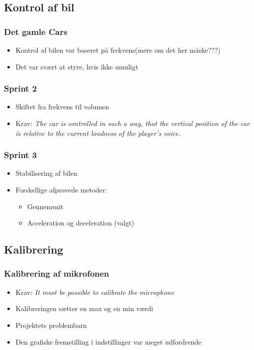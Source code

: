 \subsection{Kontrol af bil}
\begin{frame}
\frametitle{Det gamle Cars}
\begin{itemize}
\item Kontrol af bilen var baseret på frekvens(mere om det her måske???)
\item Det var svært at styre, hvis ikke umuligt
\end{itemize}
\end{frame}

\begin{frame}
\frametitle{Sprint 2}
\begin{itemize}
\item Skiftet fra frekvens til volumen
\item Krav: \textit{The car is controlled in such a way,
that the vertical position of the car is relative
to the current loudness of the player's voice.}
\end{itemize}
\begin{figure}
\centering

\end{figure}
\end{frame}

\begin{frame}
\frametitle{Sprint 3}
\begin{itemize}
\item Stabilisering af bilen
\item Forskellige afprøvede metoder:
\begin{itemize}
\item Gennemsnit
\item Acceleration og deceleration (valgt)
\end{itemize}
\end{itemize}
\end{frame}


\subsection{Kalibrering}
\begin{frame}
\frametitle{Kalibrering af mikrofonen}
\begin{itemize}
\item Krav: \textit{It must be possible to calibrate the microphone}
\item Kalibreringen sætter en max og en min værdi
\item Projektets problembarn
\item Den grafiske fremstilling i indstillinger var meget udfordrende
\end{itemize}
\end{frame}

